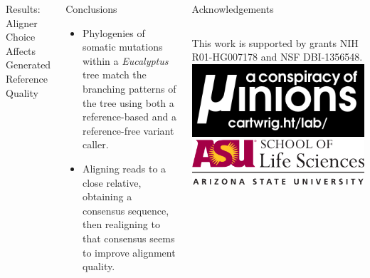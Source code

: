 \documentclass{beamer}
\begin{document}
\begin{frame}{}
\begin{columns}
\begin{block}{Results: Aligner Choice Affects Generated Reference Quality}
\end{block}




\begin{block}{Conclusions}

\begin{itemize}
	\item Phylogenies of somatic mutations within a \textit{Eucalyptus} tree match the branching patterns of the tree using both a reference-based and a reference-free variant caller.
	\item Aligning reads to a close relative, obtaining a consensus sequence, then realigning to that consensus seems to improve alignment quality.
\end{itemize}

\end{block}


\begin{block}{Acknowledgements}


\begin{columns}
This work is supported by grants NIH R01-HG007178 and NSF DBI-1356548.
\includegraphics[width=\linewidth]{lab_logo.pdf}
\includegraphics[width=\linewidth]{sols_logo.pdf}
\end{columns}


\end{block}

\end{columns}
\end{frame}
\end{document}
